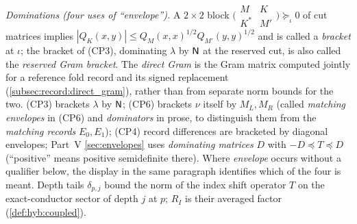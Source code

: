 \emph{Dominations (four uses of ``envelope'').}
A $2\times2$ block
$\bigl(\begin{smallmatrix}M&K\\K^*&M'\end{smallmatrix}\bigr)
\succeq_\iota0$ of cut matrices implies
$|Q_K(x,y)|\le Q_M(x,x)^{1/2}Q_{M'}(y,y)^{1/2}$ and is called a
\emph{bracket} at $\iota$; the bracket of (CP3), dominating
$\lambda$ by $\mathsf N$ at the reserved cut, is also called the
\emph{reserved Gram bracket}. The \emph{direct Gram} is the Gram
matrix computed jointly for a reference fold record and its signed
replacement (\cref{subsec:record:direct_gram}), rather than from
separate norm bounds for the two.
(CP3) brackets $\lambda$ by $\mathsf N$; (CP6) brackets $\nu$ itself by
$M_L,M_R$ (called \emph{matching envelopes} in (CP6) and
\emph{dominators} in prose, to distinguish them from the
\emph{matching records} $E_0,E_1$); (CP4) record differences are
bracketed by diagonal envelopes; Part~V \cref{sec:envelopes} uses
\emph{dominating matrices} $D$ with $-D\preceq T\preceq D$
(``positive'' means positive semidefinite there). Where
\emph{envelope} occurs without a qualifier below, the display in
the same paragraph identifies which of the four is meant. Depth tails
$\delta_{p,j}$ bound the norm of the index
shift operator $T$ on the exact-conductor sector of depth $j$ at
$p$; $R_I$ is their
averaged factor (\cref{def:hyb:coupled}).

